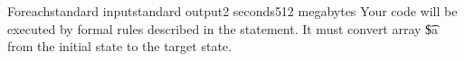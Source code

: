 \begin{problem}{Foreach}{standard input}{standard output}{2 seconds}{512 megabytes}
Your code will be executed by formal rules described in the statement. It must convert array \t{\$a} from the initial state to the target state.

\Examples

\begin{example}
%
%
\end{example}

\end{problem}

